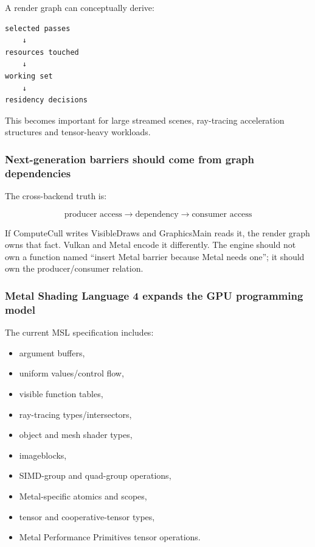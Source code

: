 A render graph can conceptually derive:

\begin{verbatim}
selected passes
    ↓
resources touched
    ↓
working set
    ↓
residency decisions
\end{verbatim}

This becomes important for large streamed scenes, ray-tracing acceleration structures and tensor-heavy workloads.

\subsubsection{Next-generation barriers should come from graph dependencies}\label{05-engine-i-ch022-next-generation-barriers-should-come-from-graph-dependencies}

The cross-backend truth is:

\[
\boxed{
\text{producer access}
\rightarrow
\text{dependency}
\rightarrow
\text{consumer access}
}
\]

If ComputeCull writes VisibleDraws and GraphicsMain reads it, the render graph owns that fact. Vulkan and Metal encode it differently. The engine should not own a function named ``insert Metal barrier because Metal needs one''; it should own the producer/consumer relation.

\subsubsection{Metal Shading Language 4 expands the GPU programming model}\label{05-engine-i-ch022-metal-shading-language-4-expands-the-gpu-programming-model}

The current MSL specification includes:

\begin{itemize}
\tightlist
\item
  argument buffers,
\item
  uniform values/control flow,
\item
  visible function tables,
\item
  ray-tracing types/intersectors,
\item
  object and mesh shader types,
\item
  imageblocks,
\item
  SIMD-group and quad-group operations,
\item
  Metal-specific atomics and scopes,
\item
  tensor and cooperative-tensor types,
\item
  Metal Performance Primitives tensor operations.
\end{itemize}

